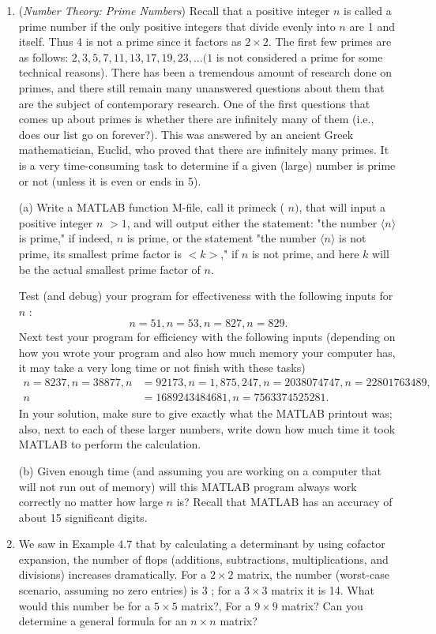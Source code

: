 \documentclass[../main.tex]{subfiles}
\begin{document}
\begin{enumerate}
\item (\emph{Number Theory: Prime Numbers}) Recall that a positive integer $n$ is called a prime number if the only positive integers that divide evenly into $n$ are 1 and itself. Thus 4 is not a prime since it factors as $2 \times 2$. The first few primes are as follows: $2,3,5,7,11,13,17,19,23, \ldots(1$ is not considered a prime for some technical reasons). There has been a tremendous amount of research done on primes, and there still remain many unanswered questions about them that are the subject of contemporary research. One of the first questions that comes up about primes is whether there are infinitely many of them (i.e., does our list go on forever?). This was answered by an ancient Greek mathematician, Euclid, who proved that there are infinitely many primes. It is a very time-consuming task to determine if a given (large) number is prime or not (unless it is even or ends in 5).

(a) Write a MATLAB function M-file, call it primeck ( $n)$, that will input a positive integer $n$ $>1$, and will output either the statement: "the number $\langle n\rangle$ is prime," if indeed, $n$ is prime, or the statement "the number $\langle n\rangle$ is not prime, its smallest prime factor is $<k>$," if $n$ is not prime, and here $k$ will be the actual smallest prime factor of $n$.

Test (and debug) your program for effectiveness with the following inputs for $n$ :
$$
n=51, n=53, n=827, n=829 .
$$
Next test your program for efficiency with the following inputs (depending on how you wrote your program and also how much memory your computer has, it may take a very long time or not finish with these tasks)
$$
\begin{aligned}
n=8237, n=38877, n &=92173, n=1,875,247, n=2038074747, n=22801763489, \\
n &=1689243484681, n=7563374525281 .
\end{aligned}
$$
In your solution, make sure to give exactly what the MATLAB printout was; also, next to each of these larger numbers, write down how much time it took MATLAB to perform the calculation.

(b) Given enough time (and assuming you are working on a computer that will not run out of memory) will this MATLAB program always work correctly no matter how large $n$ is? Recall that MATLAB has an accuracy of about 15 significant digits.

\item We saw in Example $4.7$ that by calculating a determinant by using cofactor expansion, the number of flops (additions, subtractions, multiplications, and divisions) increases dramatically. For a $2 \times 2$ matrix, the number (worst-case scenario, assuming no zero entries) is 3 ; for a $3 \times 3$ matrix it is 14. What would this number be for a $5 \times 5$ matrix?, For a $9 \times 9$ matrix? Can you determine a general formula for an $n \times n$ matrix?


\end{enumerate}
\end{document}
